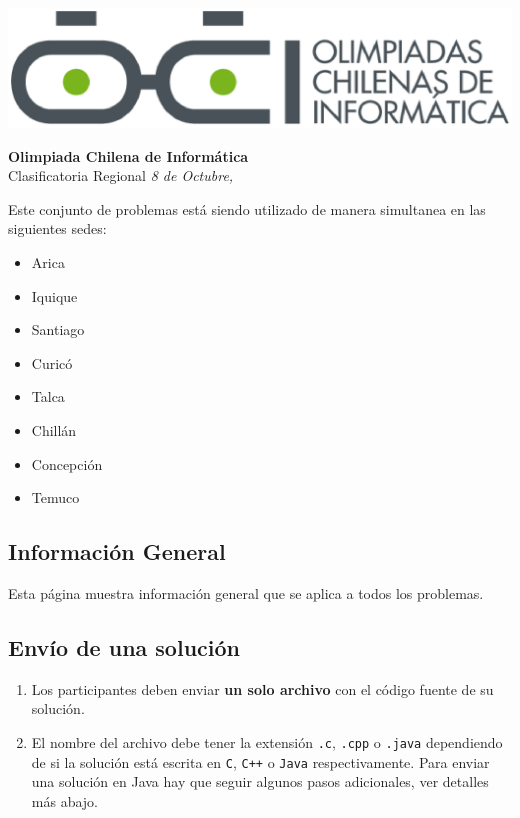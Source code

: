 \documentclass[12pt]{oci}
\begin{document}
\begin{titlingpage}
  \begin{center}
  \includegraphics[scale=0.6]{logo.eps}

  \vskip 70pt
  \Large{\bf Olimpiada Chilena de Informática\\ \the\year}
  \vskip 10pt
  \large{Clasificatoria Regional}
  \vskip 10pt
  \normalsize{\it 8 de Octubre, \the\year}


  \vskip 95pt

  \end{center}
  Este conjunto de problemas está siendo utilizado de manera simultanea en las siguientes sedes:

  \begin{itemize}[leftmargin=*]
  \item Arica
  \item Iquique
  \item Santiago
  \item Curicó
  \item Talca
  \item Chillán
  \item Concepción
  \item Temuco
  \end{itemize}
\end{titlingpage}

\cleardoublepage

\subsection*{Información General}

Esta página muestra información general que se aplica a todos los problemas.

\subsection*{Envío de una solución}

\begin{enumerate}
\item Los participantes deben enviar {\bf un solo archivo} con el código fuente de su solución.
\item El nombre del archivo debe tener la extensión \verb+.c+, \verb+.cpp+ o
  \verb+.java+ dependiendo de si la solución está escrita en \verb|C|,
  \verb|C++| o \verb|Java| respectivamente.
Para enviar una solución en Java hay que seguir algunos pasos adicionales, ver detalles más abajo.
\end{enumerate}
\end{document}
